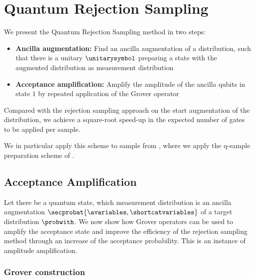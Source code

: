\section{Quantum Rejection Sampling}\label{sec:sampling}

We present the Quantum Rejection Sampling method in two steps:
\begin{itemize}
    \item {\bf Ancilla augmentation:} Find an ancilla augmentation of a distribution, such that there is a unitary $\unitarysymbol$ preparing a state with the augmented distribution as measurement distribution
    \item {\bf Acceptance amplification:} Amplify the amplitude of the ancilla qubits in state $1$ by repeated application of the Grover operator
\end{itemize}
Compared with the rejection sampling approach on the start augmentation of the distribution, we achieve a square-root speed-up in the expected number of gates to be applied per sample.

We in particular apply this scheme to sample from \ComputationActivationNetworks{}, where we apply the q-sample preparation scheme of .

\subsection{Acceptance Amplification}

Let there be a quantum state, which measurement distribution is an ancilla augmentation $\secprobat{\avariables,\shortcatvariables}$ of a target distribution $\probwith$.
We now show how Grover operators can be used to amplify the acceptance state and improve the efficiency of the rejection sampling method through an increase of the acceptance probability.
This is an instance of amplitude amplification.

\subsubsection{Grover construction}

